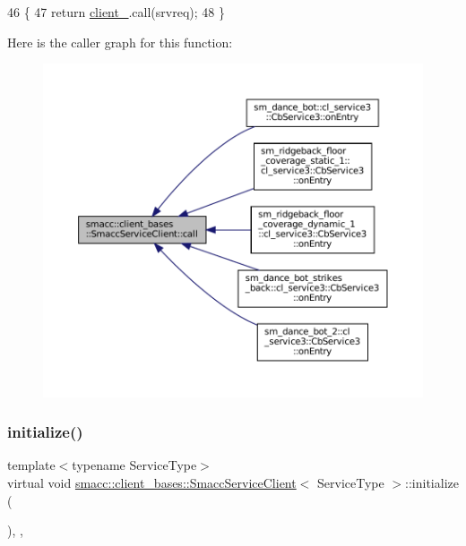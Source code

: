 \begin{DoxyCode}
46     \{
47         \textcolor{keywordflow}{return} \hyperlink{classsmacc_1_1client__bases_1_1SmaccServiceClient_a632093eb6bc8b058dec492b21c8536f9}{client\_}.call(srvreq);
48     \}
\end{DoxyCode}
Here is the caller graph for this function\+:
\nopagebreak
\begin{figure}[H]
\begin{center}
\leavevmode
\includegraphics[width=350pt]{classsmacc_1_1client__bases_1_1SmaccServiceClient_a0e9914f45f1091c38bb9ad6187d07977_icgraph}
\end{center}
\end{figure}
\mbox{\label{classsmacc_1_1client__bases_1_1SmaccServiceClient_aa51b80828e4ab19627210440ae15b6f3}} 
\subsubsection{\texorpdfstring{initialize()}{initialize()}}
{\footnotesize\ttfamily template$<$typename Service\+Type$>$ \\
virtual void \hyperlink{classsmacc_1_1client__bases_1_1SmaccServiceClient}{smacc\+::client\+\_\+bases\+::\+Smacc\+Service\+Client}$<$ Service\+Type $>$\+::initialize (\begin{DoxyParamCaption}{ }\end{DoxyParamCaption})\hspace{0.3cm}{\ttfamily [inline]}, {\ttfamily [override]}, {\ttfamily [virtual]}}



